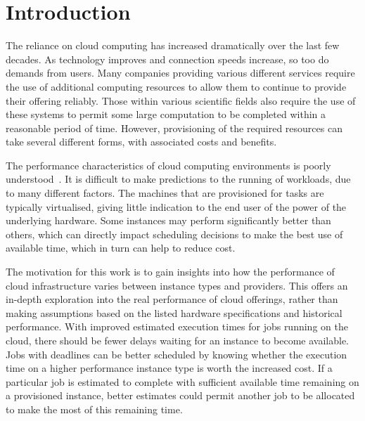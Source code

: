 \documentclass{entcs} \usepackage{entcsmacro}
\begin{document}

\section{Introduction}\label{sec:introduction}

The reliance on cloud computing has increased dramatically over the last few decades. As technology improves and connection speeds increase, so too do demands from users. Many companies providing various different services require the use of additional computing resources to allow them to continue to provide their offering reliably. Those within various scientific fields also require the use of these systems to permit some large computation to be completed within a reasonable period of time. However, provisioning of the required resources can take several different forms, with associated costs and benefits.

The performance characteristics of cloud computing environments is poorly understood~\cite{mohamed2017performance}. It is difficult to make predictions to the running of workloads, due to many different factors. The machines that are provisioned for tasks are typically virtualised, giving little indication to the end user of the power of the underlying hardware. Some instances may perform significantly better than others, which can directly impact scheduling decisions to make the best use of available time, which in turn can help to reduce cost.

The motivation for this work is to gain insights into how the performance of cloud infrastructure varies between instance types and providers. This offers an in-depth exploration into the real performance of cloud offerings, rather than making assumptions based on the listed hardware specifications and historical performance. With improved estimated execution times for jobs running on the cloud, there should be fewer delays waiting for an instance to become available. Jobs with deadlines can be better scheduled by knowing whether the execution time on a higher performance instance type is worth the increased cost. If a particular job is estimated to complete with sufficient available time remaining on a provisioned instance, better estimates could permit another job to be allocated to make the most of this remaining time.
\end{document}
